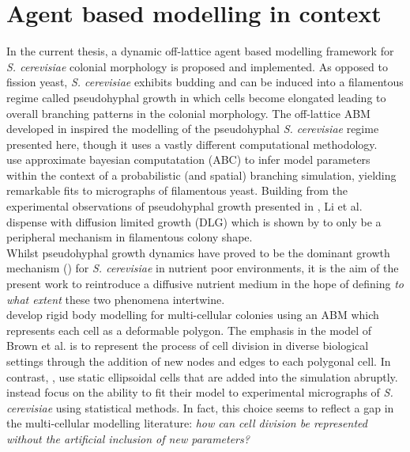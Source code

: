  \section{Agent based modelling in context}

 In the current thesis, a dynamic off-lattice agent based modelling framework for \textit{S. cerevisiae} 
 colonial morphology 
 is proposed and implemented. As opposed to fission yeast, \textit{S. cerevisiae} exhibits 
 budding and can be induced into a filamentous regime called pseudohyphal growth
 in which cells become elongated leading to overall branching patterns 
 in the colonial morphology. The off-lattice ABM developed in \cite{li2024off} 
 inspired the modelling of the pseudohyphal \textit{S. cerevisiae} regime 
 presented here, though it uses a vastly different computational methodology.
 \\

 \cite{li2024off} use approximate bayesian computatation (ABC)
 to infer model parameters within the context of a probabilistic (and spatial) branching simulation, 
 yielding remarkable fits to micrographs of filamentous yeast. Building 
 from the experimental observations of pseudohyphal growth presented in 
 \cite{gimeno1992unipolar}, Li et al. dispense with diffusion limited growth (DLG) which is
shown by \cite{tronnolone2018diffusion} to only be a peripheral mechanism in filamentous 
colony shape.
\\

Whilst pseudohyphal growth dynamics
have proved to be the dominant growth mechanism (\cite{tronnolone2018diffusion}) for 
\textit{S. cerevisiae} in nutrient poor environments, it is the aim of the present 
work to reintroduce a diffusive nutrient medium in the hope of defining 
\textit{to what extent} these two phenomena intertwine.
\\

\cite{brown2021rigid} develop rigid body modelling for multi-cellular colonies using 
an ABM which represents each cell as a deformable polygon. The emphasis in the model 
of Brown et al. is to represent the process of cell division in diverse biological 
settings through the addition of new nodes and edges to each polygonal cell. 
In contrast, \cite{li2024off}, use static ellipsoidal cells that are added into the simulation
abruptly. \cite{li2024off} instead focus on the ability to fit their model 
to experimental micrographs of \textit{S. cerevisiae} using statistical methods.
In fact, this choice seems to reflect a gap in the multi-cellular modelling literature:
\textit{how can cell division be represented without the artificial inclusion of new parameters?}
\\

